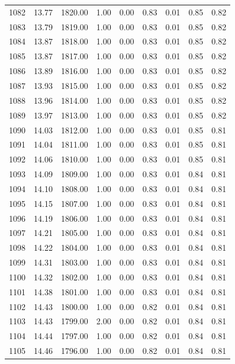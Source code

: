\documentclass{article}\usepackage[]{graphicx}\usepackage[]{color}
\begin{document}
\begin{longtable}{rrrrrrrrr}
  1082 & 13.77 & 1820.00 & 1.00 & 0.00 & 0.83 & 0.01 & 0.85 & 0.82 \\ 
  1083 & 13.79 & 1819.00 & 1.00 & 0.00 & 0.83 & 0.01 & 0.85 & 0.82 \\ 
  1084 & 13.87 & 1818.00 & 1.00 & 0.00 & 0.83 & 0.01 & 0.85 & 0.82 \\ 
  1085 & 13.87 & 1817.00 & 1.00 & 0.00 & 0.83 & 0.01 & 0.85 & 0.82 \\ 
  1086 & 13.89 & 1816.00 & 1.00 & 0.00 & 0.83 & 0.01 & 0.85 & 0.82 \\ 
  1087 & 13.93 & 1815.00 & 1.00 & 0.00 & 0.83 & 0.01 & 0.85 & 0.82 \\ 
  1088 & 13.96 & 1814.00 & 1.00 & 0.00 & 0.83 & 0.01 & 0.85 & 0.82 \\ 
  1089 & 13.97 & 1813.00 & 1.00 & 0.00 & 0.83 & 0.01 & 0.85 & 0.82 \\ 
  1090 & 14.03 & 1812.00 & 1.00 & 0.00 & 0.83 & 0.01 & 0.85 & 0.81 \\ 
  1091 & 14.04 & 1811.00 & 1.00 & 0.00 & 0.83 & 0.01 & 0.85 & 0.81 \\ 
  1092 & 14.06 & 1810.00 & 1.00 & 0.00 & 0.83 & 0.01 & 0.85 & 0.81 \\ 
  1093 & 14.09 & 1809.00 & 1.00 & 0.00 & 0.83 & 0.01 & 0.84 & 0.81 \\ 
  1094 & 14.10 & 1808.00 & 1.00 & 0.00 & 0.83 & 0.01 & 0.84 & 0.81 \\ 
  1095 & 14.15 & 1807.00 & 1.00 & 0.00 & 0.83 & 0.01 & 0.84 & 0.81 \\ 
  1096 & 14.19 & 1806.00 & 1.00 & 0.00 & 0.83 & 0.01 & 0.84 & 0.81 \\ 
  1097 & 14.21 & 1805.00 & 1.00 & 0.00 & 0.83 & 0.01 & 0.84 & 0.81 \\ 
  1098 & 14.22 & 1804.00 & 1.00 & 0.00 & 0.83 & 0.01 & 0.84 & 0.81 \\ 
  1099 & 14.31 & 1803.00 & 1.00 & 0.00 & 0.83 & 0.01 & 0.84 & 0.81 \\ 
  1100 & 14.32 & 1802.00 & 1.00 & 0.00 & 0.83 & 0.01 & 0.84 & 0.81 \\ 
  1101 & 14.38 & 1801.00 & 1.00 & 0.00 & 0.83 & 0.01 & 0.84 & 0.81 \\ 
  1102 & 14.43 & 1800.00 & 1.00 & 0.00 & 0.82 & 0.01 & 0.84 & 0.81 \\ 
  1103 & 14.43 & 1799.00 & 2.00 & 0.00 & 0.82 & 0.01 & 0.84 & 0.81 \\ 
  1104 & 14.44 & 1797.00 & 1.00 & 0.00 & 0.82 & 0.01 & 0.84 & 0.81 \\ 
  1105 & 14.46 & 1796.00 & 1.00 & 0.00 & 0.82 & 0.01 & 0.84 & 0.81 \\ 

\end{longtable}
\end{document}
